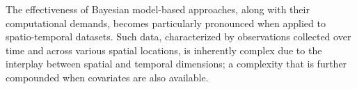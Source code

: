 \documentclass[12pt,	%
	a4paper,		%
	twoside,		%
	openright,		%
	titlepage,%
	]{book}
\theoremstyle{definition}
\begin{document}

The effectiveness of Bayesian model-based approaches, along with their computational demands, becomes particularly pronounced when applied to spatio-temporal datasets. Such data, characterized by observations collected over time and across various spatial locations, is inherently complex due to the interplay between spatial and temporal dimensions; a complexity that is further compounded when covariates are also available.
\end{document}
